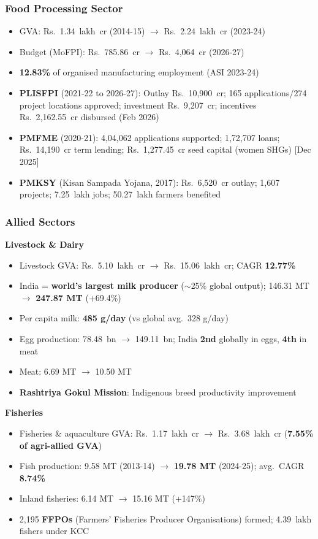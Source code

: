 \subsubsection*{Food Processing Sector}
\begin{itemize}
  \item GVA: Rs.~1.34~lakh~cr (2014-15) $\to$ Rs.~2.24~lakh~cr (2023-24)
  \item Budget (MoFPI): Rs.~785.86~cr $\to$ Rs.~4,064~cr (2026-27)
  \item \textbf{12.83\%} of organised manufacturing employment (ASI 2023-24)
  \item \textbf{PLISFPI} (2021-22 to 2026-27): Outlay Rs.~10,900~cr; 165 applications/274 project locations approved; investment Rs.~9,207~cr; incentives Rs.~2,162.55~cr disbursed (Feb 2026)
  \item \textbf{PMFME} (2020-21): 4,04,062 applications supported; 1,72,707 loans; Rs.~14,190~cr term lending; Rs.~1,277.45~cr seed capital (women SHGs) [Dec 2025]
  \item \textbf{PMKSY} (Kisan Sampada Yojana, 2017): Rs.~6,520~cr outlay; 1,607 projects; 7.25~lakh jobs; 50.27~lakh farmers benefited
\end{itemize}

\subsubsection*{Allied Sectors}

\textbf{Livestock \& Dairy}
\begin{itemize}
  \item Livestock GVA: Rs.~5.10~lakh~cr $\to$ Rs.~15.06~lakh~cr; CAGR \textbf{12.77\%}
  \item India = \textbf{world's largest milk producer} ($\sim$25\% global output); 146.31 MT $\to$ \textbf{247.87 MT} (+69.4\%)
  \item Per capita milk: \textbf{485 g/day} (vs global avg.\ 328 g/day)
  \item Egg production: 78.48~bn $\to$ 149.11~bn; India \textbf{2nd} globally in eggs, \textbf{4th} in meat
  \item Meat: 6.69 MT $\to$ 10.50 MT
  \item \textbf{Rashtriya Gokul Mission}: Indigenous breed productivity improvement
\end{itemize}

\textbf{Fisheries}
\begin{itemize}
  \item Fisheries \& aquaculture GVA: Rs.~1.17~lakh~cr $\to$ Rs.~3.68~lakh~cr (\textbf{7.55\% of agri-allied GVA})
  \item Fish production: 9.58 MT (2013-14) $\to$ \textbf{19.78 MT} (2024-25); avg.\ CAGR \textbf{8.74\%}
  \item Inland fisheries: 6.14 MT $\to$ 15.16 MT (+147\%)
  \item 2,195 \textbf{FFPOs} (Farmers' Fisheries Producer Organisations) formed; 4.39~lakh fishers under KCC
\end{itemize}

